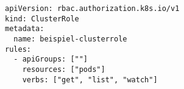 \begin{verbatim}
apiVersion: rbac.authorization.k8s.io/v1
kind: ClusterRole
metadata:
  name: beispiel-clusterrole
rules:
  - apiGroups: [""]
    resources: ["pods"]
    verbs: ["get", "list", "watch"]
\end{verbatim}